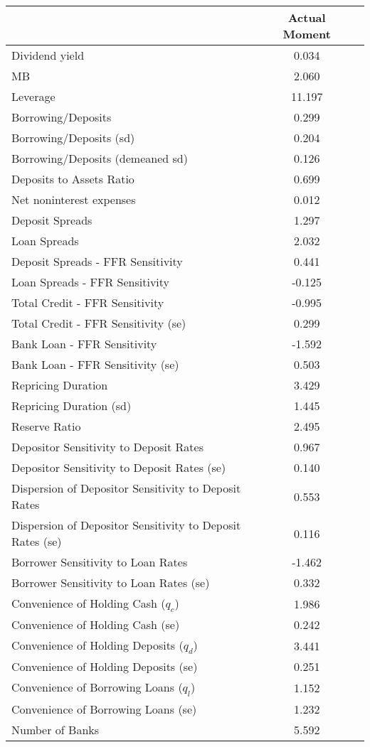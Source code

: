 \begin{tabular*}{\hsize}{@{\hskip\tabcolsep\extracolsep\fill}l*{2}{c}}\hline \hline & {Actual Moment}  &    \\ [1ex] \hline  Dividend yield&0.034&\\
MB&2.060&\\
Leverage&11.197&\\
Borrowing/Deposits&0.299&\\
Borrowing/Deposits (sd)&0.204&\\
Borrowing/Deposits (demeaned sd)&0.126&\\
Deposits to Assets Ratio&0.699&\\
Net noninterest expenses&0.012&\\
Deposit Spreads&1.297&\\
Loan Spreads&2.032&\\
Deposit Spreads - FFR Sensitivity&0.441&\\
Loan Spreads - FFR Sensitivity&-0.125&\\
Total Credit - FFR Sensitivity&-0.995&\\
Total Credit - FFR Sensitivity (se)&0.299&\\
Bank Loan - FFR Sensitivity&-1.592&\\
Bank Loan - FFR Sensitivity (se)&0.503&\\
Repricing Duration&3.429&\\
Repricing Duration (sd)&1.445&\\
Reserve Ratio&2.495&\\
Depositor Sensitivity to Deposit Rates&0.967&\\
Depositor Sensitivity to Deposit Rates (se)&0.140&\\
Dispersion of Depositor Sensitivity to Deposit Rates&0.553&\\
Dispersion of Depositor Sensitivity to Deposit Rates (se)&0.116&\\
Borrower Sensitivity to Loan Rates&-1.462&\\
Borrower Sensitivity to Loan Rates (se)&0.332&\\
Convenience of Holding Cash ($q_c$)&1.986&\\
Convenience of Holding Cash (se)&0.242&\\
Convenience of Holding Deposits ($q_d$)&3.441&\\
Convenience of Holding Deposits (se)&0.251&\\
Convenience of Borrowing Loans ($q_l$)&1.152&\\
Convenience of Borrowing Loans (se)&1.232&\\
Number of Banks&5.592&\\
\hline \hline \end{tabular*}
